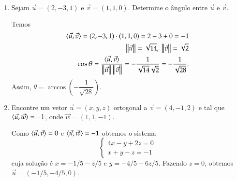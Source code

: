 \begin{exemplos}
  \begin{enumerate}
    \item Sejam $\vec{u} = (2, -3, 1)$ e $\vec{v} = (1,1, 0)$. Determine o \^angulo entre $\vec{u}$ e $\vec{v}$.
    \begin{solucao}
      Temos
      \begin{align*}
        \langle \vec{u}, \vec{v} \rangle = (2, -3, 1)\cdot(1,1,0) = 2 - 3 + 0 = -1\\
        \left\Vert{\vec{u}}\right\Vert = \sqrt{14},\ \left\Vert{\vec{v}}\right\Vert = \sqrt{2}\\
        \cos\theta = \frac{\langle \vec{u}, \vec{v} \rangle}{\left\Vert{\vec{u}}\right\Vert\left\Vert{\vec{v}}\right\Vert} = -\dfrac{1}{\sqrt{14}\sqrt{2}} = -\dfrac{1}{\sqrt{28}}.
      \end{align*}
      Assim, $\theta = \arccos\left(-\dfrac{1}{\sqrt{28}}\right)$.
    \end{solucao}
    \item Encontre um vetor $\vec{u} = (x, y, z)$ ortogonal a $\vec{v} = (4, -1, 2)$ e tal que $\langle \vec{u}, \vec{w} \rangle = -1$, onde $\vec{w} = (1,1,-1)$.
    \begin{solucao}
      Como $\langle \vec{u}, \vec{v} \rangle = 0$ e $\langle \vec{u}, \vec{w} \rangle = -1$ obtemos o sistema
      \[
        \begin{cases}
          4x - y + 2z = 0\\
          x + y - z = -1
        \end{cases}
      \]
      cuja solu\c{c}\~ao \'e $x = -1/5 - z/5$ e $y = -4/5 + 6z/5$. Fazendo $z = 0$, obtemos $\vec{u} = (-1/5, -4/5, 0)$.
    \end{solucao}
  \end{enumerate}
\end{exemplos}

